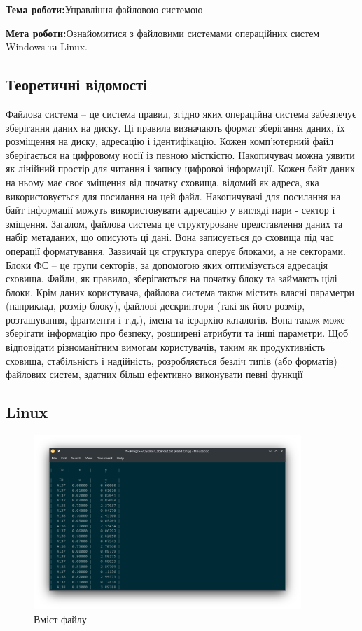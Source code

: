 \documentclass[12pt]{extarticle}
\begin{document}
\textbf{Тема роботи:}Управління файловою системою
\vspace{12pt}

\textbf{Мета роботи:}Ознайомитися з файловими системами операційних систем Windows та Linux.

\subsection*{Теоретичні відомості}
Файлова система – це система правил, згідно яких операційна система
забезпечує зберігання даних на диску. Ці правила визначають формат зберігання
даних, їх розміщення на диску, адресацію і ідентифікацію.
Кожен комп'ютерний файл зберігається на цифровому носії із певною місткістю.
Накопичувач можна уявити як лінійний простір для читання і запису цифрової
інформації. Кожен байт даних на ньому має своє зміщення від початку сховища,
відомий як адреса, яка використовується для посилання на цей файл.
Накопичувачі для посилання на байт інформації можуть використовувати
адресацію у вигляді пари - сектор і зміщення.
Загалом, файлова система це структуроване представлення даних та набір
метаданих, що описують ці дані. Вона записується до сховища під час операції
форматування. Зазвичай ця структура оперує блоками, а не секторами. Блоки ФС
– це групи секторів, за допомогою яких оптимізується адресація сховища.
Файли, як правило, зберігаються на початку блоку та займають цілі блоки.
Крім даних користувача, файлова система також містить власні параметри
(наприклад, розмір блоку), файлові дескриптори (такі як його розмір,
розташування, фрагменти і т.д.), імена та ієрархію каталогів. Вона також може
зберігати інформацію про безпеку, розширені атрибути та інші параметри.
Щоб відповідати різноманітним вимогам користувачів, таким як продуктивність
сховища, стабільність і надійність, розробляється безліч типів (або форматів)
файлових систем, здатних більш ефективно виконувати певні функції

\subsection*{Linux}


\begin{figure}[H]
    \centering
    \includegraphics[width=0.90\textwidth]{linux_txt}
    \caption{Вміст файлу}
\end{figure}
\end{document}
